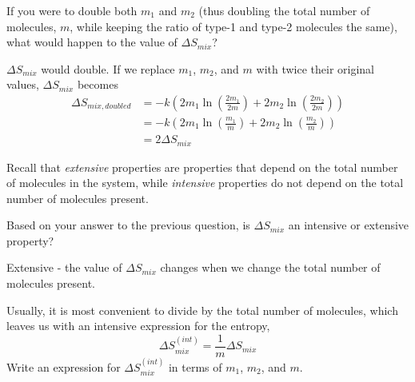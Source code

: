 \begin{activity}
\begin{ctqs}

	\question If you were to double both $m_1$ and $m_2$ (thus doubling the total number of molecules, $m$, while keeping the ratio of type-1 and type-2 molecules the same), what would happen to the value of $\Delta S_{mix}$?
	
		\begin{solution}[1in]
		
			$\Delta S_{mix}$ would double.  If we replace $m_1$, $m_2$, and $m$ with twice their original values, $\Delta S_{mix}$ becomes
			\vspace{-6pt}
			\begin{align*}
				\Delta S_{mix,doubled} &= -k\left(2m_1 \ln\left(\frac{2m_1}{2m}\right) + 2m_2 \ln\left(\frac{2m_2}{2m}\right) \right)\\
				 &= -k\left(2m_1 \ln\left(\frac{m_1}{m}\right) + 2m_2 \ln\left(\frac{m_2}{m}\right) \right)\\
				 &= 2\Delta S_{mix}
			\end{align*}
		\end{solution}
	
	
	\question Recall that \emph{extensive} properties are properties that depend on the total number of molecules in the system, while \emph{intensive} properties do not depend on the total number of molecules present.
	
	Based on your answer to the previous question, is $\Delta S_{mix}$ an intensive or extensive property?
	
		\begin{solution}[0.75in]
		
			Extensive - the value of $\Delta S_{mix}$ changes when we change the total number of molecules present.
		
		\end{solution}
	
	\question Usually, it is most convenient to divide by the total number of molecules, which leaves us with an intensive expression for the entropy,
		\begin{equation*}
			\Delta S_{mix}^{(int)} = \frac{1}{m} \Delta S_{mix}
		\end{equation*}
		Write an expression for $\Delta S_{mix}^{(int)}$ in terms of $m_1$, $m_2$, and $m$.
		
			\begin{solution}[1in]
			

\end{solution}
\end{ctqs}
\end{activity}
